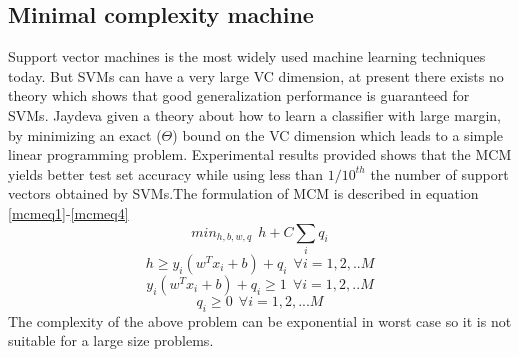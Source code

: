 \subsection{Minimal complexity machine}\label{mcmPaperReview}
Support vector machines is the most widely used machine learning techniques today. But SVMs can have a very large VC dimension, at present there exists no theory which shows that good generalization performance is guaranteed for SVMs. Jaydeva \cite{MCM} given a theory about how to learn a classifier with large margin, by minimizing an exact (\textbf{$\Theta$}) bound on the VC dimension which leads to a simple linear programming problem. Experimental results provided shows that the MCM yields better test set accuracy while using less than $1/10^{th}$ the number of support vectors obtained by SVMs.The formulation of MCM is described in equation \ref{mcmeq1}-\ref{mcmeq4}
\begin{equation}\label{mcmeq1}
min_{h,b,w,q}\:\: h + C\sum_i{q_i}
\end{equation}
\begin{equation}\label{mcmeq2}
h \geq y_i(w^Tx_i+b)+ q_i \:\:\forall i={1, 2, .. M}
\end{equation}
\begin{equation}\label{mcmeq3}
y_i(w^Tx_i +b) + q_i \geq 1 \:\:\forall i={1,2,.. M}
\end{equation}
\begin{equation}\label{mcmeq4}
q_i \geq 0 \:\:\forall i={1, 2, ... M}
\end{equation}
The complexity of the above problem can be exponential in worst case so it is not suitable for a large size problems.

